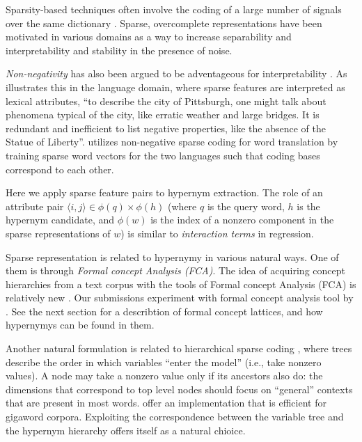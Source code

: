\documentclass[11pt,a4paper]{article}
\begin{document}
Sparsity-based techniques often involve the coding of a large number of signals
over the same dictionary \citep{Rubinstein:2008}. Sparse, overcomplete
representations have been motivated in various domains as a way to increase
separability and interpretability \citep{Olshausen:1997} and
stability in the presence of noise.

\emph{Non-negativity} has also been argued to be adventageous for interpretability
\citep{Faruqui:2015,Fyshe:2015,Arora:2016}. As \citet{Subramanian:2018}
illustrates this in the language domain, where sparse features are interpreted
as lexical attributes, ``to describe the city of Pittsburgh, one might talk
about phenomena typical of the city, like erratic weather and large bridges. It
is redundant and inefficient to list negative properties, like the absence of
the Statue of Liberty''.
\citet{Berend:2018} utilizes non-negative sparse coding for word translation by
training sparse word vectors for the two languages such that coding bases
correspond to each other.

Here we apply sparse feature pairs to hypernym extraction. The role of an
attribute pair $\langle i,j\rangle\in\phi(q)\times\phi(h)$ (where $q$ is the query word,
$h$ is the hypernym candidate, and $\phi(w)$ is the index of a nonzero
component in the sparse representations of $w$) is similar to \emph{interaction
terms} in regression.

Sparse representation is related to hypernymy in various natural ways.  One of
them is through \emph{Formal concept Analysis (FCA)}.  The idea of acquiring concept
hierarchies from a text corpus with the tools of Formal concept Analysis (FCA)
is relatively new \citep{Cimiano:2005}.
Our submissions experiment with formal concept analysis tool by
\citet{Endres:2010}. See the next section for a describtion of formal concept
lattices, and how hypernymys can be found in them.

Another natural formulation is related to hierarchical sparse coding
\citep{Zhao:2009}, where trees describe the order in which variables “enter the
model” (i.e., take nonzero values). A node may take a nonzero value only if its
ancestors also do: the dimensions that correspond to top level nodes should
focus on “general” contexts that are present in most words.
\citet{Yogatama:2015} offer an implementation that is efficient for gigaword
corpora. Exploiting the correspondence between the variable tree and the
hypernym hierarchy offers itself as a natural chioice.
\end{document}
